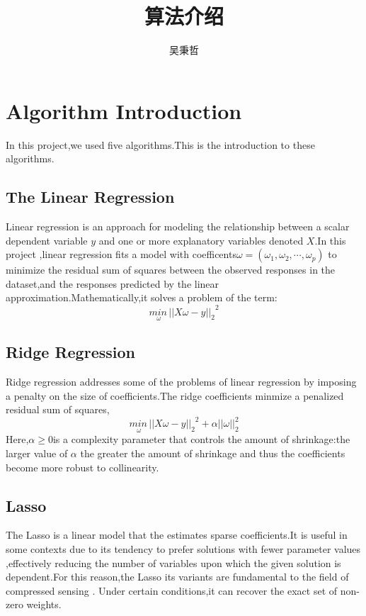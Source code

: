 \documentclass[10pt,a4paper]{ctexart}
\author{吴秉哲}
\title{算法介绍}
\begin{document}
    \maketitle
    \section{Algorithm Introduction}
    In this project,we used five algorithms.This is the introduction
    to these algorithms.
    \subsection{The Linear Regression}
    Linear regression is an approach for modeling the relationship between
    a scalar dependent variable $y$ and one or more explanatory variables denoted
    $X$.In this project ,linear regression fits a model with coefficents$\omega = (\omega_1,\omega_2,\cdots,\omega_p)$
    to minimize the residual sum of squares between the observed responses in the dataset,and the responses predicted
    by the linear approximation.Mathematically,it solves a problem of the term:
    \begin{equation}
        \underset{\omega}{min\,}{||X\omega-y||_2}^2
    \end{equation}
    \subsection{Ridge Regression}
    Ridge regression addresses some of the problems of linear regression by imposing a
    penalty on the size of coefficients.The ridge coefficients minmize a penalized residual sum of 
    squares,
    \begin{equation*}
    	\underset{\omega}{min\,}{||X\omega-y||_2}^2+\alpha||\omega||_2^2
    \end{equation*} 
    Here,$\alpha \geq 0$is a complexity parameter that controls the amount of shrinkage:the larger value of $\alpha$
    the greater the amount of shrinkage and thus the coefficients become more robust to collinearity.
    \subsection{Lasso}
    The Lasso is a linear model that the estimates sparse coefficients.It
    is useful in some contexts due to its tendency to prefer solutions with
    fewer parameter values ,effectively reducing the number of variables upon which the given solution is dependent.For this reason,the Lasso
    its variants are fundamental to the field of compressed sensing .
    Under certain conditions,it can recover the exact set of non-zero 
    weights.
    
\end{document}
